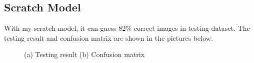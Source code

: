 \documentclass[runningheads]{llncs}
\begin{document}
\subsection{\large\bf Scratch Model}
With my scratch model, it can guess 82\% correct images in testing dataset. The testing result and confusion matrix are shown in the pictures below.
\begin{figure}[H]
    \centering
    \caption{(a) Testing result (b) Confusion matrix}
    \label{fig:sc_test}
\end{figure}
\end{document}

